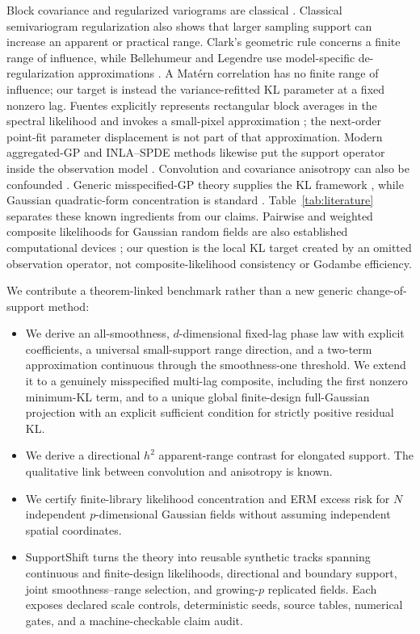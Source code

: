 \documentclass[sigconf]{acmart}
\theoremstyle{remark}
\begin{document}
Block covariance and regularized variograms are classical
\cite{chiles2012geostatistics,gelfand2001support,gotway2002incompatible}.
Classical semivariogram regularization also shows that larger sampling support
can increase an apparent or practical range. Clark's geometric rule concerns a
finite range of influence, while Bellehumeur and Legendre use model-specific
de-regularization approximations
\cite{clark1977regularization,bellehumeur1997aggregation}. A Matérn
correlation has no finite range of influence; our target is instead the
variance-refitted KL parameter at a fixed nonzero lag.
Fuentes explicitly represents rectangular block averages in the spectral
likelihood and invokes a small-pixel approximation
\cite{fuentes2007approximate}; the next-order point-fit parameter displacement
is not part of that approximation.
Modern aggregated-GP and INLA--SPDE methods likewise put the support operator
inside the observation model \cite{tanaka2019aggregated,zheng2026fusion}.
Convolution and covariance anisotropy can also be confounded
\cite{clifford2006yield,paciorek2006nonstationary}. Generic misspecified-GP
theory supplies the KL framework \cite{bachoc2018misspecified}, while Gaussian
quadratic-form concentration is standard
\cite{laurent2000quadratic,hsu2012quadratic}. Table~\ref{tab:literature}
separates these known ingredients from our claims.
Pairwise and weighted composite likelihoods for Gaussian random fields are also
established computational devices \cite{varin2011composite,bevilacqua2012weighted};
our question is the local KL target created by an omitted observation operator,
not composite-likelihood consistency or Godambe efficiency.

We contribute a theorem-linked benchmark rather than a new generic
change-of-support method:

\begin{itemize}
  \item We derive an all-smoothness, \(d\)-dimensional fixed-lag phase law
  with explicit coefficients, a universal small-support range direction, and a
  two-term approximation continuous through the smoothness-one threshold. We
  extend it to a genuinely misspecified multi-lag composite, including the
  first nonzero minimum-KL term, and to a unique global finite-design
  full-Gaussian projection with an explicit sufficient condition for strictly
  positive residual KL.
  \item We derive a directional \(h^2\) apparent-range contrast for elongated
  support. The qualitative link between convolution and anisotropy is known.
  \item We certify finite-library likelihood concentration and ERM excess risk
  for \(N\) independent \(p\)-dimensional Gaussian fields without assuming
  independent spatial coordinates.
  \item SupportShift turns the theory into reusable synthetic tracks spanning
  continuous and finite-design likelihoods, directional and boundary support,
  joint smoothness--range selection, and growing-\(p\) replicated fields. Each
  exposes declared scale controls,
  deterministic seeds, source tables, numerical gates, and a machine-checkable
  claim audit.
\end{itemize}
\end{document}
